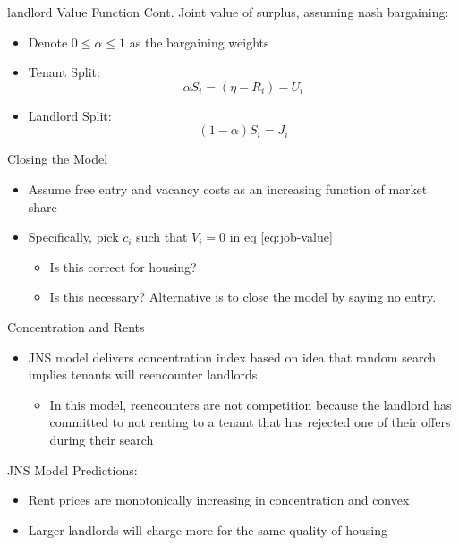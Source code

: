 \documentclass[10pt, xcolor=dvipsnames]{beamer}
\begin{document}
\begin{frame}{landlord Value Function Cont.}
Joint value of surplus, assuming nash bargaining:
    \begin{itemize}
        \item Denote $0\leq \alpha \leq 1$ as the bargaining weights
        \item Tenant Split: \begin{equation}\label{eq:nash-tenant}
            \alpha S_i = (\eta - R_i) - U_i
        \end{equation}
        \item Landlord Split: \begin{equation}\label{eq:nash-landlord}
            (1-\alpha)S_i = J_i
        \end{equation}
    \end{itemize}
\end{frame}

\begin{frame}{Closing the Model}
    \begin{itemize}
    \item Assume free entry and vacancy costs as an increasing function of market share
    \item Specifically, pick $c_i$ such that $V_i=0$ in eq \ref{eq:job-value}
    \begin{itemize}
        \item Is this correct for housing?
        \item Is this necessary? Alternative is to close the model by saying no entry.
    \end{itemize}
\end{itemize}
\end{frame}

\begin{frame}{Concentration and Rents}
    \begin{itemize}
        \item JNS model delivers concentration index based on idea that random search implies tenants will reencounter landlords
        \begin{itemize}
            \item In this model, reencounters are not competition because the landlord has committed to not renting to a tenant that has rejected one of their offers during their search 
        \end{itemize}
    \end{itemize}
    JNS Model Predictions:
    \begin{itemize}
        \item Rent prices are monotonically increasing in concentration and convex
        \item Larger landlords will charge more for the same quality of housing
    \end{itemize}
\end{frame}
\end{document}
